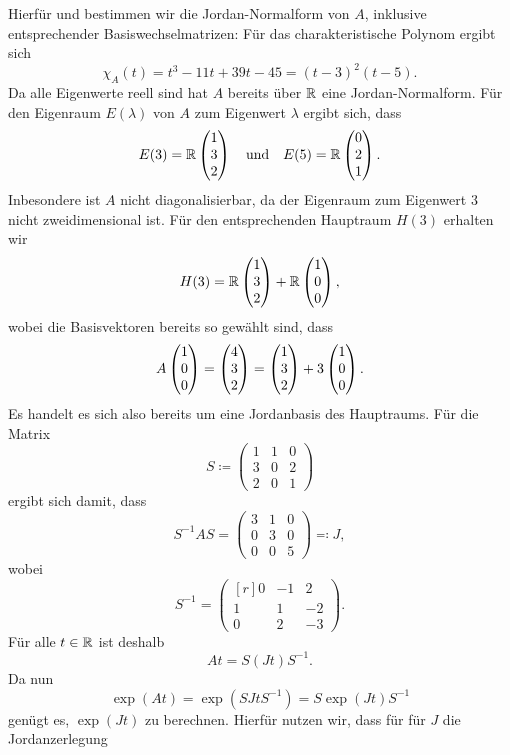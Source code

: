 \documentclass[a4paper, 10pt]{scrartcl}
\begin{document}
Hierfür und bestimmen wir die Jordan-Normalform von $A$, inklusive entsprechender Basiswechselmatrizen:
Für das charakteristische Polynom ergibt sich
\[
    \chi_A(t)
  = t^3 - 11t + 39t - 45
  = (t-3)^2 (t-5).
\]
Da alle Eigenwerte reell sind hat $A$ bereits über $\mathbb{R}$ eine Jordan-Normalform.
Für den Eigenraum $E(\lambda)$ von $A$ zum Eigenwert $\lambda$ ergibt sich, dass
\[
  E(3) = \mathbb{R} \begin{pmatrix} 1 \\ 3 \\ 2 \end{pmatrix}
  \quad\text{und}\quad
  E(5) = \mathbb{R} \begin{pmatrix} 0 \\ 2 \\ 1 \end{pmatrix}.
\]
Inbesondere ist $A$ nicht diagonalisierbar, da der Eigenraum zum Eigenwert $3$ nicht zweidimensional ist.
Für den entsprechenden Hauptraum $H(3)$ erhalten wir
\[
    H(3)
  = \mathbb{R} \begin{pmatrix} 1 \\ 3 \\ 2 \end{pmatrix} + \mathbb{R} \begin{pmatrix} 1 \\ 0 \\ 0 \end{pmatrix},
\]
wobei die Basisvektoren bereits so gewählt sind, dass
\[
    A \begin{pmatrix} 1 \\ 0 \\ 0 \end{pmatrix}
  = \begin{pmatrix} 4 \\ 3 \\ 2 \end{pmatrix}
  = \begin{pmatrix} 1 \\ 3 \\ 2 \end{pmatrix}+ 3 \begin{pmatrix} 1 \\ 0 \\ 0 \end{pmatrix}.
\]
Es handelt es sich also bereits um eine Jordanbasis des Hauptraums.
Für die Matrix
\[
  S
  \coloneqq
  \begin{pmatrix}
    1 & 1 & 0 \\
    3 & 0 & 2 \\
    2 & 0 & 1
  \end{pmatrix}
\]
ergibt sich damit, dass
\[
  S^{-1} A S
  =
  \begin{pmatrix}
    3 & 1 & 0 \\
    0 & 3 & 0 \\
    0 & 0 & 5
  \end{pmatrix}
  \eqqcolon J,
\]
wobei
\[
  S^{-1}
  =
  \begin{pmatrix*}[r]
    0 & -1  &  2  \\
    1 &  1  & -2  \\
    0 &  2  & -3
  \end{pmatrix*}.
\]
Für alle $t \in \mathbb{R}$ ist deshalb
\[
  At = S (Jt) S^{-1}.
\]
Da nun
\[
    \exp(At)
  = \exp(S Jt S^{-1})
  = S \exp(Jt) S^{-1}
\]
genügt es, $\exp(Jt)$ zu berechnen.
Hierfür nutzen wir, dass für für $J$ die Jordanzerlegung
\end{document}
